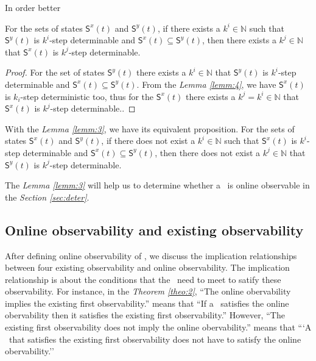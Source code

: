 In order better 
\begin{lemma}
For the sets of states $\mathsf{S}^{x}(t)$ and $\mathsf{S}^{y}(t)$, if there exists a $k^{i}\in \mathbb{N}$ such that $\mathsf{S}^{y}(t)$ is $k^{i}$-step determinable and $\mathsf{S}^{x}(t)\subseteq \mathsf{S}^{y}(t)$, then there exists a $k^{j}\in \mathbb{N}$ that $\mathsf{S}^{x}(t)$ is $k^{j}$-step determinable.
\label{lemm:3}
\end{lemma}
\begin{proof}For the set of states $\mathsf{S}^{y}(t)$ there exists a $k^{i}\in \mathbb{N}$ that $\mathsf{S}^{y}(t)$ is $k^{i}$-step determinable and $\mathsf{S}^{x}(t)\subseteq \mathsf{S}^{y}(t)$. From the {\em Lemma \ref{lemm:4}}, we have $\mathsf{S}^{x}(t)$ is $k_i$-step deterministic too, thus for the $\mathsf{S}^{x}(t)$ there exists a $k^{j}=k^{i}\in \mathbb{N}$ that $\mathsf{S}^{x}(t)$ is $k^{j}$-step determinable..
\end{proof}

With the {\em Lemma \ref{lemm:3}}, we have its equivalent proposition.
For the sets of states $\mathsf{S}^{x}(t)$ and $\mathsf{S}^{y}(t)$, if there does not exist a $k^{i}\in \mathbb{N}$ such that $\mathsf{S}^{x}(t)$ is $k^{i}$-step determinable and $\mathsf{S}^{x}(t)\subseteq \mathsf{S}^{y}(t)$, then there does not exist a $k^{j}\in \mathbb{N}$ that $\mathsf{S}^{y}(t)$ is $k^{j}$-step determinable.


The {\em Lemma \ref{lemm:3}} will help us to determine whether a \BCN\ is online observable in the {\em Section \ref{sec:deter}}.
\subsection{Online observability and existing observability}
After defining online observability of \BCNs, we discuss the implication relationships between four existing observability and online observability. The implication relationship is about the conditions that the \BCNs\ need to meet to satify these observability. For instance, in the {\em Theorem \ref{theo:2}}, ``The online obervability implies the existing first observability.'' means that ``If a \BCN\ satisfies the online obervability then it satisfies the existing first observability.'' However, ``The existing first observability does not imply the online obervability.'' means that ```A \BCN\ that satisfies the existing first observability does not have to satisfy the online obervability.''

